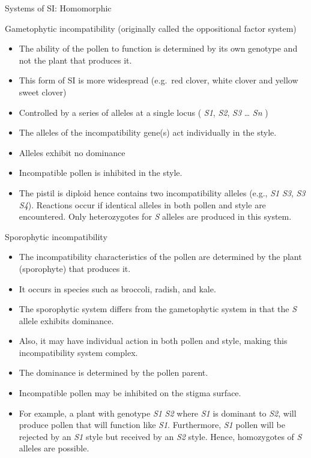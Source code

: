 \documentclass[11pt,ignorenonframetext,aspectratio=169]{beamer}
\providecommand{\tightlist}{%
  \setlength{\itemsep}{0pt}\setlength{\parskip}{0pt}}
\begin{document}
\begin{frame}{Systems of SI: Homomorphic}
\protect\hypertarget{systems-of-si-homomorphic}{}
\begin{block}{Gametophytic incompatibility (originally called the
oppositional factor system)}
\protect\hypertarget{gametophytic-incompatibility-originally-called-the-oppositional-factor-system}{}
\begin{itemize}
\tightlist
\item
  The ability of the pollen to function is determined by its own
  genotype and not the plant that produces it.
\item
  This form of SI is more widespread (e.g.~red clover, white clover and
  yellow sweet clover)
\item
  Controlled by a series of alleles at a single locus ( \emph{S1},
  \emph{S2}, \emph{S3} \ldots{} \emph{Sn} )
\item
  The alleles of the incompatibility gene(s) act individually in the
  style.
\item
  Alleles exhibit no dominance
\item
  Incompatible pollen is inhibited in the style.
\item
  The pistil is diploid hence contains two incompatibility alleles
  (e.g., \emph{S1} \emph{S3}, \emph{S3} \emph{S4}). Reactions occur if
  identical alleles in both pollen and style are encountered. Only
  heterozygotes for \emph{S} alleles are produced in this system.
\end{itemize}
\end{block}
\end{frame}

\begin{frame}{}
\protect\hypertarget{section-4}{}
\begin{block}{Sporophytic incompatibility}
\protect\hypertarget{sporophytic-incompatibility}{}
\begin{itemize}
\tightlist
\item
  The incompatibility characteristics of the pollen are determined by
  the plant (sporophyte) that produces it.
\item
  It occurs in species such as broccoli, radish, and kale.
\item
  The sporophytic system differs from the gametophytic system in that
  the \emph{S} allele exhibits dominance.
\item
  Also, it may have individual action in both pollen and style, making
  this incompatibility system complex.
\item
  The dominance is determined by the pollen parent.
\item
  Incompatible pollen may be inhibited on the stigma surface.
\item
  For example, a plant with genotype \emph{S1} \emph{S2} where \emph{S1}
  is dominant to \emph{S2}, will produce pollen that will function like
  \emph{S1}. Furthermore, \emph{S1} pollen will be rejected by an
  \emph{S1} style but received by an \emph{S2} style. Hence, homozygotes
  of \emph{S} alleles are possible.
\end{itemize}
\end{block}
\end{frame}
\end{document}
